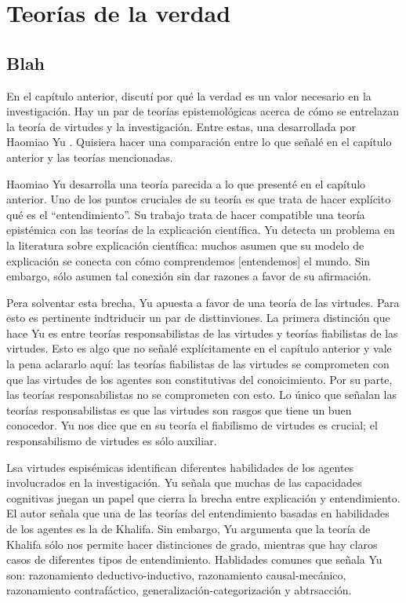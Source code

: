 

\chapter{Teorías de la verdad}
\label{ch:truththeories}

\section{Blah}

En el capítulo anterior, discutí por qué la verdad es un valor necesario en la investigación. Hay un par de teorías epistemológicas acerca de cómo se entrelazan la teoría de virtudes y la investigación. Entre estas, una desarrollada por Haomiao Yu \citeyear{yu2021}. Quisiera hacer una comparación entre lo que señalé en el capítulo anterior y las teorías mencionadas.

Haomiao Yu desarrolla una teoría parecida a lo que presenté en el capítulo anterior. Uno de los puntos cruciales de su teoría es que trata de hacer explícito qué es el ``entendimiento''. Su trabajo trata de hacer compatible una teoría epistémica con las teorías de la explicación científica. Yu detecta un problema en la literatura sobre explicación científica: muchos asumen que su modelo de explicación se conecta con cómo comprendemos [entendemos] el mundo. Sin embargo, sólo asumen tal conexión sin dar razones a favor de su afirmación.

Pera solventar esta brecha, Yu apuesta a favor de una teoría de las virtudes. Para esto es pertinente indtriducir un par de disttinviones. La primera distinción que hace Yu es entre teorías responsabilistas de las virtudes y teorías fiabilistas de las virtudes. Esto es algo que no señalé explícitamente en el capítulo anterior y vale la pena aclararlo aquí: las teorías fiabilistas de las virtudes se comprometen con que las virtudes de los agentes son constitutivas del conoicimiento. Por su parte, las teorías responsabilistas no se comprometen con esto. Lo único que señalan las teorías responsabilistas es que las virtudes son rasgos que tiene un buen conocedor. Yu nos dice que en su teoría el fiabilismo de virtudes es crucial; el responsabilismo de virtudes es sólo auxiliar.

Lsa virtudes espisémicas identifican diferentes habilidades de los agentes involucrados en la investigación. Yu señala que muchas de las capacidades cognitivas juegan un papel que cierra la brecha entre explicación y entendimiento. El autor señala que una de las teorías del entendimiento basadas en habilidades de los agentes es la de Khalifa. Sin embargo, Yu argumenta que la teoría de Khalifa sólo nos permite hacer distinciones de grado, mientras que hay claros casos de diferentes tipos de entendimiento. Hablidades comunes que señala Yu son: razonamiento deductivo-inductivo, razonamiento causal-mecánico, razonamiento contrafáctico, generalización-categorización y abtrsacción. 

